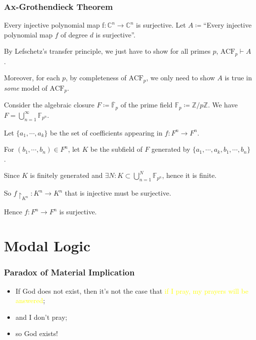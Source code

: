 \documentclass[UTF8,11pt,colorlinks,compress,openany]{beamer}%
\begin{document}
\begin{frame}\frametitle{Ax-Grothendieck Theorem}
\setlength\abovedisplayskip{0pt}
\setlength\belowdisplayskip{0pt}
\begin{block}{Every injective polynomial map f$: \mathbb{C}^n\to \mathbb{C}^n$ is surjective.}
Let $A\coloneqq $``Every injective polynomial map $f$ of degree $d$ is surjective''.

By Lefschetz's transfer principle, we just have to show for all primes $p$, $\mathrm{ACF}_p\vdash A$.

Moreover, for each $p$, by completeness of $\mathrm{ACF}_p$, we only need to show $A$ is true in \emph{some} model of $\mathrm{ACF}_p$.

Consider the algebraic closure $F\coloneqq \overline{\mathbb{F}}_p$ of the prime field $\mathbb{F}_p\coloneqq \mathbb{Z}/p\mathbb{Z}$. We have $F=\bigcup\limits_{n=1}^\infty\mathbb{F}_{p^n}$.

Let $\{a_1, \cdots, a_k\}$ be the set of coefficients appearing in $f: F^n\to F^n$.

For $(b_1, \cdots, b_n) \in F^n$, let $K$ be the subfield of $F$ generated by $\{a_1, \cdots, a_k, b_1, \cdots, b_n\}$.

Since $K$ is finitely generated and $\exists N: K\subset\bigcup\limits_{n=1}^N\mathbb{F}_{p^n}$, hence it is finite.

So $f{\restriction_{K^n}}: K^n \to K^n$ that is injective must be surjective.

Hence $f: F^n\to F^n$ is surjective.
\end{block}
\end{frame}


\section{Modal Logic}


\begin{frame}\frametitle{Paradox of Material Implication}
	\begin{itemize}
		\item If God does not exist, then it's not the case that \textcolor{yellow}{if I pray, my prayers will be answered};
		\item and I don't pray;
		\item so God exists!
	\end{itemize}
\end{frame}
\end{document}
